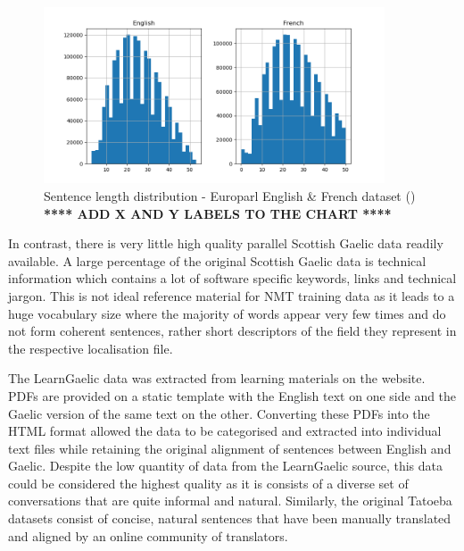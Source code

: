\begin{figure}[ht!]
\centering
\includegraphics[width=0.9\textwidth]{media/methodology/sentence_length_french.png}
\captionsetup{justification=centering,font=Large}
\caption[Diagram of the Europarl dataset sentence length distribution]{Sentence length distribution - Europarl English \& French dataset (\cite{french_corpus_2005}) \\ \textbf{**** ADD X AND Y LABELS TO THE CHART ****}}
\label{fig:sentence_length-french_legal}
\end{figure}

In contrast, there is very little high quality parallel Scottish Gaelic data readily available. A large percentage of the original Scottish Gaelic data is technical information which contains a lot of software specific keywords, links and technical jargon. This is not ideal reference material for \acrshort{NMT} training data as it leads to a huge vocabulary size where the majority of words appear very few times and do not form coherent sentences, rather short descriptors of the field they represent in the respective localisation file. 

The LearnGaelic data was extracted from learning materials on the \cite{learn_gaelic_2019} website. PDFs are provided on a static template with the English text on one side and the Gaelic version of the same text on the other. Converting these PDFs into the HTML format allowed the data to be categorised and extracted into individual text files while retaining the original alignment of sentences between English and Gaelic.
Despite the low quantity of data from the LearnGaelic source, this data could be considered the highest quality as it is consists of a diverse set of conversations that are quite informal and natural. Similarly, the original Tatoeba datasets consist of concise, natural sentences that have been manually translated and aligned by an online community of translators.

